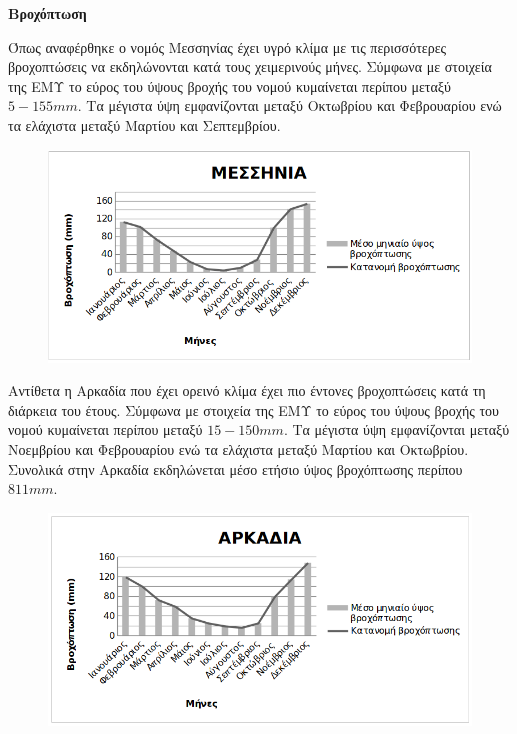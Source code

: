 \documentclass[12pt]{article}
\begin{document}
	\textbf{Βροχόπτωση}
	
	Όπως αναφέρθηκε ο νομός Μεσσηνίας έχει υγρό κλίμα με τις περισσότερες βροχοπτώσεις να εκδηλώνονται κατά τους χειμερινούς μήνες. Σύμφωνα με στοιχεία της ΕΜΥ το εύρος του ύψους βροχής του νομού κυμαίνεται περίπου μεταξύ $5-155 mm$. Τα μέγιστα ύψη εμφανίζονται μεταξύ Οκτωβρίου και Φεβρουαρίου ενώ τα ελάχιστα μεταξύ Μαρτίου και Σεπτεμβρίου. 
	
	\begin{figure} [H]
		\begin{center}
			\includegraphics [scale = 0.80] {messinia5.png}
		\end{center}
	\end{figure}

	Αντίθετα η Αρκαδία που έχει ορεινό κλίμα έχει πιο έντονες βροχοπτώσεις κατά τη διάρκεια του έτους. Σύμφωνα με στοιχεία της ΕΜΥ το εύρος του ύψους βροχής του νομού κυμαίνεται περίπου μεταξύ $15-150 mm$. Τα μέγιστα ύψη εμφανίζονται μεταξύ Νοεμβρίου και Φεβρουαρίου ενώ τα ελάχιστα μεταξύ Μαρτίου και Οκτωβρίου. Συνολικά στην Αρκαδία εκδηλώνεται μέσο ετήσιο ύψος βροχόπτωσης περίπου $811 mm$.
	
	\begin{figure} [H]
		\begin{center}
			\includegraphics [scale = 0.80] {arkadia5.png}
		\end{center}
	\end{figure}
\end{document}
